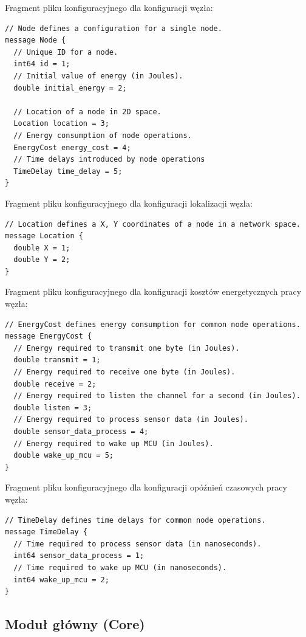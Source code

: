 \documentclass[a4paper,12pt,twoside,openany]{report}
\begin{document}
Fragment pliku konfiguracyjnego dla konfiguracji węzła:

\begin{lstlisting}
// Node defines a configuration for a single node.
message Node {
  // Unique ID for a node.
  int64 id = 1;
  // Initial value of energy (in Joules). 
  double initial_energy = 2;

  // Location of a node in 2D space.
  Location location = 3;
  // Energy consumption of node operations.
  EnergyCost energy_cost = 4;
  // Time delays introduced by node operations
  TimeDelay time_delay = 5;
}
\end{lstlisting}

Fragment pliku konfiguracyjnego dla konfiguracji lokalizacji węzła:

\begin{lstlisting}
// Location defines a X, Y coordinates of a node in a network space.
message Location {
  double X = 1;
  double Y = 2;
}
\end{lstlisting}

Fragment pliku konfiguracyjnego dla konfiguracji kosztów energetycznych pracy węzła:

\begin{lstlisting}
// EnergyCost defines energy consumption for common node operations.
message EnergyCost {
  // Energy required to transmit one byte (in Joules).
  double transmit = 1;
  // Energy required to receive one byte (in Joules).
  double receive = 2;
  // Energy required to listen the channel for a second (in Joules).
  double listen = 3;
  // Energy required to process sensor data (in Joules).
  double sensor_data_process = 4;
  // Energy required to wake up MCU (in Joules).
  double wake_up_mcu = 5;
}
\end{lstlisting}

Fragment pliku konfiguracyjnego dla konfiguracji opóźnień czasowych pracy węzła:

\begin{lstlisting}
// TimeDelay defines time delays for common node operations.
message TimeDelay {
  // Time required to process sensor data (in nanoseconds).
  int64 sensor_data_process = 1;
  // Time required to wake up MCU (in nanoseconds).
  int64 wake_up_mcu = 2;
}
\end{lstlisting}

\subsection{Moduł główny (Core)}
\end{document}
